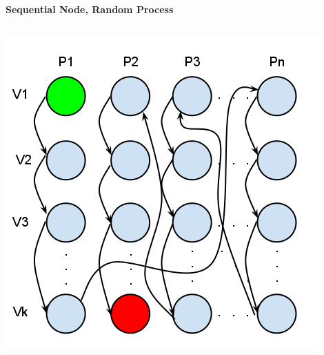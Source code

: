 \documentclass[final]{beamer}
\begin{document}
\begin{frame}[t]
\begin{columns}[t]
\begin{column}{0.60\paperwidth}
\begin{columns}[t,totalwidth=0.60\paperwidth]
\begin{column}{0.28\paperwidth}
\begin{columns}[t,totalwidth=0.28\paperwidth]
\begin{column}{0.12\paperwidth}
							\end{column}
						\end{columns}
					\end{column}
				\end{columns}
				\begin{columns}[t,totalwidth=0.60\paperwidth]
					\begin{column}{0.28\paperwidth}
						\begin{center} \bf{Sequential Node, Random Process} \end{center}
						\begin{columns}[t,totalwidth=0.28\paperwidth]
							\begin{column}{0.12\paperwidth}
								\begin{center} \includegraphics[width=0.12\paperwidth]{img/linked_list/seq_node_rand_proc} \end{center}
							\end{column}
							\begin{column}{0.12\paperwidth}

\end{column}
\end{columns}
\end{column}
\end{columns}
\end{column}
\end{columns}
\end{frame}
\end{document}
